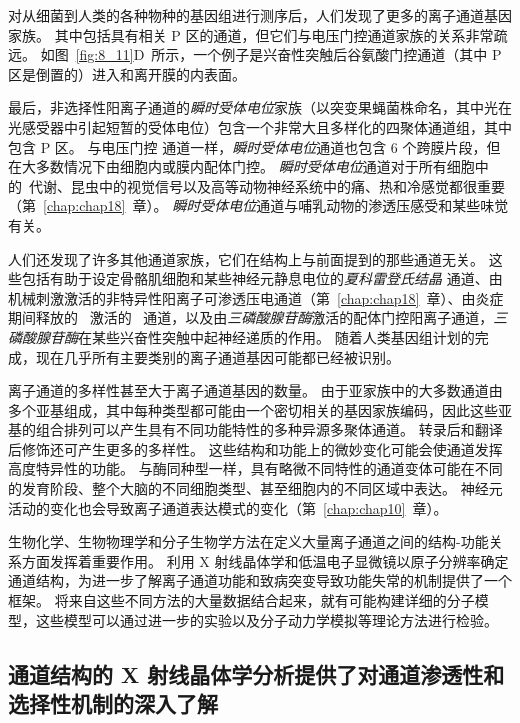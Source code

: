 对从细菌到人类的各种物种的基因组进行测序后，人们发现了更多的离子通道基因家族。
其中包括具有相关 P 区的通道，但它们与电压门控通道家族的关系非常疏远。
如图~\ref{fig:8_11}D~所示，一个例子是兴奋性突触后谷氨酸门控通道（其中 P 区是倒置的）进入和离开膜的内表面。


最后，非选择性阳离子通道的\textit{瞬时受体电位}家族（以突变果蝇菌株命名，其中光在光感受器中引起短暂的受体电位）包含一个非常大且多样化的四聚体通道组，其中包含 P 区。
与电压门控  通道一样，\textit{瞬时受体电位}通道也包含 6 个跨膜片段，但在大多数情况下由细胞内或膜内配体门控。
\textit{瞬时受体电位}通道对于所有细胞中的~代谢、昆虫中的视觉信号以及高等动物神经系统中的痛、热和冷感觉都很重要（第~\ref{chap:chap18}~章）。
\textit{瞬时受体电位}通道与哺乳动物的渗透压感受和某些味觉有关。


人们还发现了许多其他通道家族，它们在结构上与前面提到的那些通道无关。
这些包括有助于设定骨骼肌细胞和某些神经元静息电位的\textit{夏科雷登氏结晶}  通道、由机械刺激激活的非特异性阳离子可渗透压电通道（第~\ref{chap:chap18}~章）、由炎症期间释放的~ 激活的~ 通道，以及由\textit{三磷酸腺苷酶}激活的配体门控阳离子通道，\textit{三磷酸腺苷酶}在某些兴奋性突触中起神经递质的作用。
随着人类基因组计划的完成，现在几乎所有主要类别的离子通道基因可能都已经被识别。


离子通道的多样性甚至大于离子通道基因的数量。
由于亚家族中的大多数通道由多个亚基组成，其中每种类型都可能由一个密切相关的基因家族编码，因此这些亚基的组合排列可以产生具有不同功能特性的多种异源多聚体通道。
转录后和翻译后修饰还可产生更多的多样性。
这些结构和功能上的微妙变化可能会使通道发挥高度特异性的功能。
与酶同种型一样，具有略微不同特性的通道变体可能在不同的发育阶段、整个大脑的不同细胞类型、甚至细胞内的不同区域中表达。
神经元活动的变化也会导致离子通道表达模式的变化（第~\ref{chap:chap10}~章）。


生物化学、生物物理学和分子生物学方法在定义大量离子通道之间的结构-功能关系方面发挥着重要作用。
利用 X 射线晶体学和低温电子显微镜以原子分辨率确定通道结构，为进一步了解离子通道功能和致病突变导致功能失常的机制提供了一个框架。
将来自这些不同方法的大量数据结合起来，就有可能构建详细的分子模型，这些模型可以通过进一步的实验以及分子动力学模拟等理论方法进行检验。





\subsection{通道结构的 X 射线晶体学分析提供了对通道渗透性和选择性机制的深入了解}


